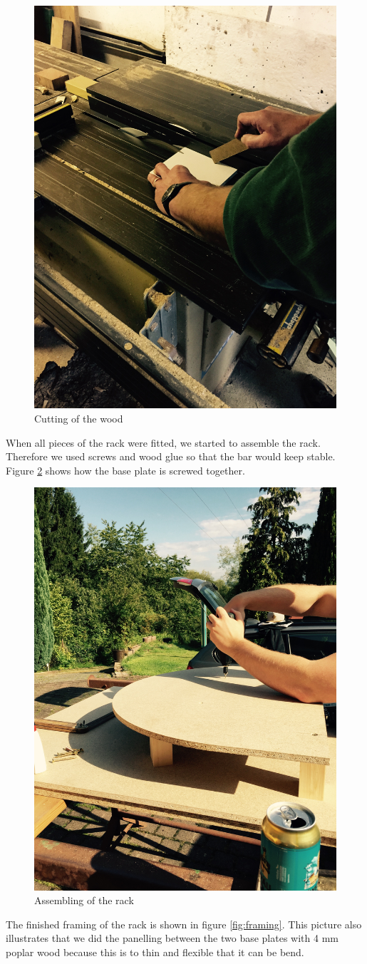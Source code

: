 \documentclass{acm_proc_article-sp}
\begin{document}
\begin{figure}[htbp] 
  \centering
     \includegraphics[width=0.5\linewidth]{pictures/cutting_wood.jpg}
  \caption{Cutting of the wood}
  \label{fig:cutting_wood}
\end{figure}

When all pieces of the rack were fitted, we started to assemble the rack. Therefore we used screws and wood glue so that the bar would keep stable. Figure \ref{fig:assembling} shows how the base plate is screwed together.

\begin{figure}[htbp] 
  \centering
     \includegraphics[width=0.5\linewidth]{pictures/assembling.jpg}
  \caption{Assembling of the rack}
  \label{fig:assembling}
\end{figure}

The finished framing of the rack is shown in figure \ref{fig:framing}. This picture also illustrates that we did the panelling between the two base plates with 4 mm poplar wood because this is to thin and flexible that it can be bend.
\end{document}
